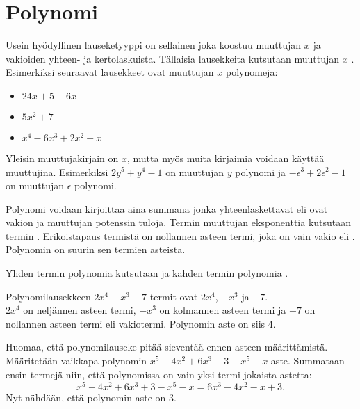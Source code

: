 \chapter{Polynomi}
Usein hyödyllinen lauseketyyppi on sellainen joka koostuu muuttujan $x$ ja
vakioiden yhteen- ja kertolaskuista. Tällaisia lausekkeita kutsutaan muuttujan
$x$ . Esimerkiksi seuraavat lausekkeet ovat muuttujan $x$ polynomeja:
\begin{itemize}
\item $24x + 5 - 6x$
\item $5x^2+7$
\item $x^4-6x^3+2x^2-x$
\end{itemize}

Yleisin muuttujakirjain on $x$, mutta myös muita kirjaimia voidaan käyttää
muuttujina. Esimerkiksi $2y^5+y^4-1$ on muuttujan $y$ polynomi ja
$-\epsilon^3+2\epsilon^2-1$ on muuttujan $\epsilon$ polynomi.

Polynomi voidaan kirjoittaa aina summana jonka yhteenlaskettavat eli
 ovat vakion ja muuttujan potenssin tuloja. Termin muuttujan
eksponenttia kutsutaan termin . Erikoistapaus termistä on
nollannen asteen termi, joka on vain vakio eli . Polynomin
 on suurin sen termien asteista.

Yhden termin polynomia kutsutaan  ja kahden termin polynomia
.

\begin{esimerkki}
Polynomilausekkeen $2x^4-x^3-7$ termit ovat $2x^4$, $-x^3$ ja $-7$. \\
$2x^4$ on neljännen asteen termi, $-x^3$ on kolmannen asteen termi ja $-7$ on nollannen
asteen termi eli vakiotermi. Polynomin aste on siis 4.
\end{esimerkki}

Huomaa, että polynomilauseke pitää sieventää ennen asteen määrittämistä.
Määritetään vaikkapa polynomin $x^5-4x^2+6x^3+3-x^5-x$ aste.
Summataan ensin termejä niin, että
polynomissa on vain yksi termi jokaista astetta:
\[x^5-4x^2+6x^3+3-x^5-x = 6x^3-4x^2-x+3.\]
Nyt nähdään, että polynomin aste on 3.

\begin{comment}
\laatikko{
Polynomi $P$, joka on astetta $n$, voidaan aina sieventää muotoon
\[P(x) = a_n x^n + a_{n-1} x^{n-1} + \ldots + a_1 x + a_0,\]
missä $a_0, a_1, \ldots, a_n$ ovat vakioita ja $a_n \neq 0$.
}
\end{comment}

